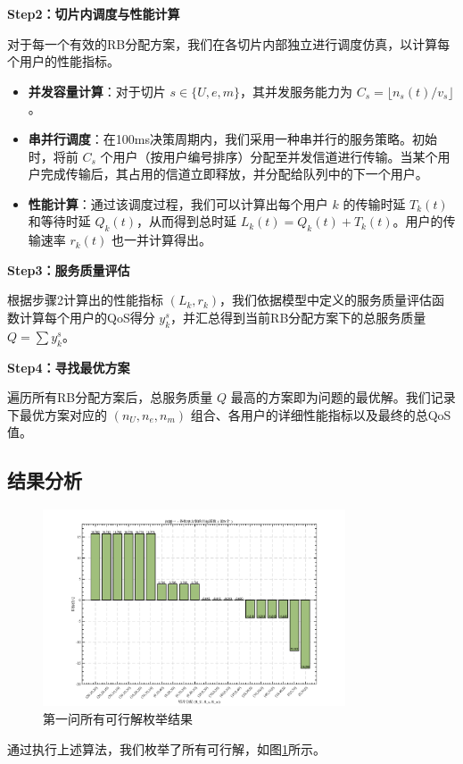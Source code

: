 \textbf{Step2：切片内调度与性能计算}

对于每一个有效的RB分配方案，我们在各切片内部独立进行调度仿真，以计算每个用户的性能指标。
\begin{itemize}
    \item \textbf{并发容量计算}：对于切片 $s \in \{U, e, m\}$，其并发服务能力为 $C_s = \lfloor n_s(t) / v_s \rfloor$。
    \item \textbf{串并行调度}：在100ms决策周期内，我们采用一种串并行的服务策略。初始时，将前 $C_s$ 个用户（按用户编号排序）分配至并发信道进行传输。当某个用户完成传输后，其占用的信道立即释放，并分配给队列中的下一个用户。
    \item \textbf{性能计算}：通过该调度过程，我们可以计算出每个用户 $k$ 的传输时延 $T_k(t)$ 和等待时延 $Q_k(t)$，从而得到总时延 $L_k(t) = Q_k(t) + T_k(t)$。用户的传输速率 $r_k(t)$ 也一并计算得出。
\end{itemize}

\textbf{Step3：服务质量评估}

根据步骤2计算出的性能指标 $(L_k, r_k)$，我们依据模型中定义的服务质量评估函数计算每个用户的QoS得分 $y_k^s$，并汇总得到当前RB分配方案下的总服务质量 $Q = \sum y_k^s$。

\textbf{Step4：寻找最优方案}

遍历所有RB分配方案后，总服务质量 $Q$ 最高的方案即为问题的最优解。我们记录下最优方案对应的 $(n_U, n_e, n_m)$ 组合、各用户的详细性能指标以及最终的总QoS值。

\subsection{结果分析}

\begin{figure}[H]
    \centering
    \includegraphics[width=0.8\textwidth]{figures/q1求解结果.pdf}
    \caption{第一问所有可行解枚举结果}
    \label{fig:q1_result}
\end{figure}
通过执行上述算法，我们枚举了所有可行解，如图\ref{fig:q1_result}所示。

